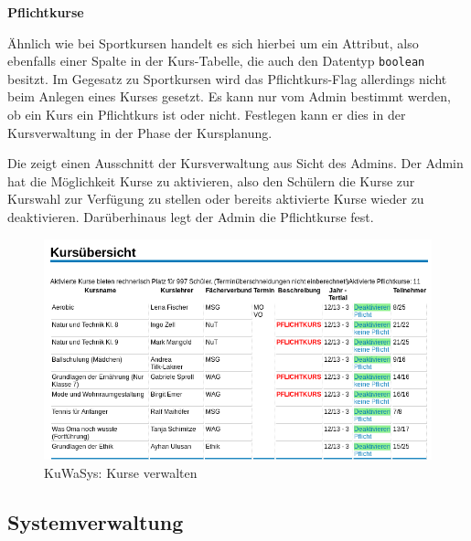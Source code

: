 \textbf{Pflichtkurse}

Ähnlich wie bei Sportkursen handelt es sich hierbei um ein Attribut, also ebenfalls einer Spalte in der Kurs-Tabelle, die auch den Datentyp \texttt{boolean} besitzt.
Im Gegesatz zu Sportkursen wird das Pflichtkurs-Flag allerdings nicht beim Anlegen eines Kurses gesetzt. Es kann nur vom Admin bestimmt werden, ob ein Kurs ein Pflichtkurs ist oder nicht. Festlegen kann er dies in der Kursverwaltung in der Phase der Kursplanung.

Die  zeigt einen Ausschnitt der Kursverwaltung aus Sicht des Admins.
Der Admin hat die Möglichkeit Kurse zu aktivieren, also den Schülern die Kurse zur Kurswahl zur Verfügung zu stellen oder bereits aktivierte Kurse wieder zu deaktivieren.
Darüberhinaus legt der Admin die Pflichtkurse fest.

\begin{figure}[H]
 \begin{center}
   \includegraphics[scale=0.6]{img/KursVerwalten_KuWaSys.png}
 \end{center}
 \caption[\textbf{KuWaSys: Kurse verwalten}]{KuWaSys: Kurse verwalten}
 \label{fig:KursVerwalten_KuWaSys}
\end{figure}

\subsection{Systemverwaltung}

